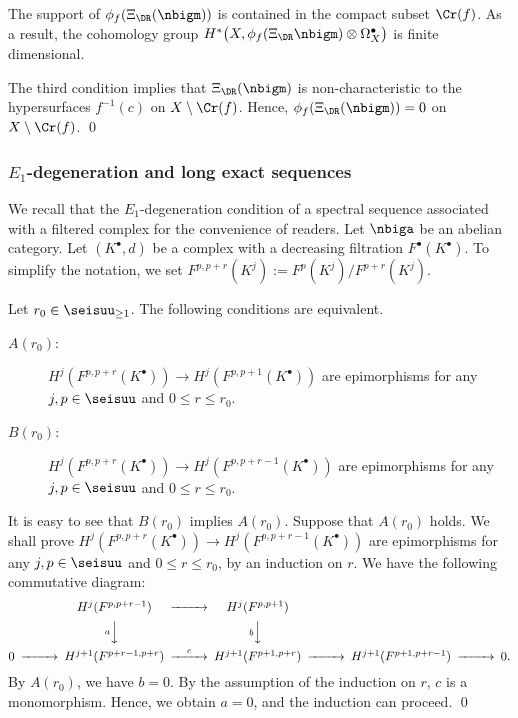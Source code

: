 \documentclass[a4,10pt]{article}
\begin{document}
\begin{lem}
\label{lem;25.8.26.10}
The support of $\phi_f(\Xi_{\DR}(\nbigm))$
is contained in the compact subset $\Cr(f)$.
As a result,
the cohomology group
 $H^{\ast}\bigl(
 X,\phi_f(\Xi_{\DR}\nbigm)\otimes\Omega^{\bullet}_X
 \bigr)$
is finite dimensional.
\end{lem}
\pf
The third condition implies that
$\Xi_{\DR}(\nbigm)$ is non-characteristic to
the hypersurfaces $f^{-1}(c)$ on $X\setminus\Cr(f)$.
Hence, $\phi_f(\Xi_{\DR}(\nbigm))=0$ on $X\setminus \Cr(f)$.
\hfill\qed

\subsubsection{$E_1$-degeneration and long exact sequences}
\label{subsection;25.8.25.10}

We recall that the $E_1$-degeneration condition
of a spectral sequence associated with a filtered complex
for the convenience of readers.
Let $\nbiga$ be an abelian category.
Let $(K^{\bullet},d)$ be a complex
with a decreasing filtration $F^{\bullet}(K^{\bullet})$.
To simplify the notation,
we set
$F^{p,p+r}(K^{j}):=F^p(K^{j})/F^{p+r}(K^{j})$.

\begin{lem}
Let $r_0\in\seisuu_{\geq 1}$.
The following conditions are equivalent.
\begin{description}
 \item[$A(r_0)$:] $H^j(F^{p,p+r}(K^{\bullet}))
       \to
       H^j(F^{p,p+1}(K^{\bullet}))$
    are epimorphisms for any $j,p\in\seisuu$
    and $0\leq r\leq r_0$.
 \item[$B(r_0)$:] $H^j(F^{p,p+r}(K^{\bullet}))
       \to
       H^j(F^{p,p+r-1}(K^{\bullet}))$
       are epimorphisms for any $j,p\in\seisuu$
      and $0\leq r\leq r_0$.
\end{description}
\end{lem}
\pf
It is easy to see that $B(r_0)$ implies $A(r_0)$.
Suppose that $A(r_0)$ holds.
We shall prove
$H^j(F^{p,p+r}(K^{\bullet}))
\to
H^j(F^{p,p+r-1}(K^{\bullet}))$
are epimorphisms for any $j,p\in\seisuu$
and $0\leq r\leq r_0$,
by an induction on $r$.
We have the following commutative diagram:
\[
\begin{CD}
 @. H^j(F^{p,p+r-1})
 @>>> H^j(F^{p,p+1}) \\
 @. @V{a}VV @V{b}VV \\
 0 @>>>
 H^{j+1}(F^{p+r-1,p+r})
 @>{c}>>
 H^{j+1}(F^{p+1,p+r})
 @>>>
 H^{j+1}(F^{p+1,p+r-1})
 @>>> 0.
\end{CD}
\]
By $A(r_0)$,
we have $b=0$.
By the assumption of the induction on $r$,
$c$ is a monomorphism.
Hence, we obtain $a=0$,
and the induction can proceed.
\hfill\qed
\end{document}

